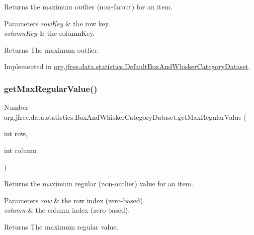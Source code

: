 Returns the maximum outlier (non-\/farout) for an item.


\begin{DoxyParams}{Parameters}
{\em row\+Key} & the row key. \\
\hline
{\em column\+Key} & the column\+Key.\\
\hline
\end{DoxyParams}
\begin{DoxyReturn}{Returns}
The maximum outlier. 
\end{DoxyReturn}


Implemented in \mbox{\hyperlink{classorg_1_1jfree_1_1data_1_1statistics_1_1_default_box_and_whisker_category_dataset_a566f976a566e583b34846b17d4fd79c2}{org.\+jfree.\+data.\+statistics.\+Default\+Box\+And\+Whisker\+Category\+Dataset}}.

\mbox{\label{interfaceorg_1_1jfree_1_1data_1_1statistics_1_1_box_and_whisker_category_dataset_a4dc17471f39dbde635664e9040f6fd21}} 
\subsubsection{\texorpdfstring{get\+Max\+Regular\+Value()}{getMaxRegularValue()}\hspace{0.1cm}{\footnotesize\ttfamily [1/2]}}
{\footnotesize\ttfamily Number org.\+jfree.\+data.\+statistics.\+Box\+And\+Whisker\+Category\+Dataset.\+get\+Max\+Regular\+Value (\begin{DoxyParamCaption}\item[{int}]{row,  }\item[{int}]{column }\end{DoxyParamCaption})}

Returns the maximum regular (non-\/outlier) value for an item.


\begin{DoxyParams}{Parameters}
{\em row} & the row index (zero-\/based). \\
\hline
{\em column} & the column index (zero-\/based).\\
\hline
\end{DoxyParams}
\begin{DoxyReturn}{Returns}
The maximum regular value. 
\end{DoxyReturn}


